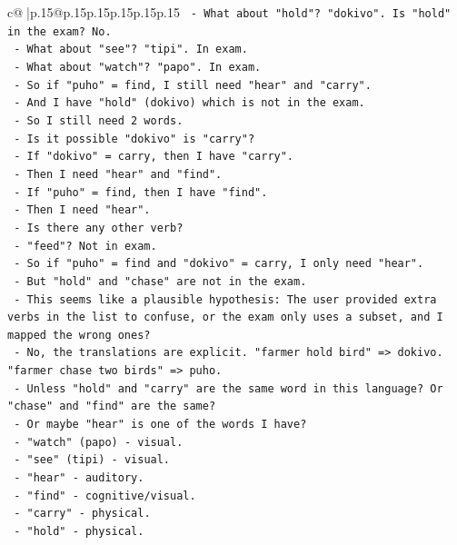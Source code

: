 \documentclass{article}
\begin{document}
{\begin{supertabular}{c@{$\;$}|p{.15\linewidth}@{}p{.15\linewidth}p{.15\linewidth}p{.15\linewidth}p{.15\linewidth}p{.15\linewidth}}
{{{\texttt{     {-} What about "hold"? "dokivo". Is "hold" in the exam? No.} \\
\texttt{     {-} What about "see"? "tipi". In exam.} \\
\texttt{     {-} What about "watch"? "papo". In exam.} \\
\texttt{     {-} So if "puho" = find, I still need "hear" and "carry".} \\
\texttt{     {-} And I have "hold" (dokivo) which is not in the exam.} \\
\texttt{     {-} So I still need 2 words.} \\
\texttt{     {-} Is it possible "dokivo" is "carry"?} \\
\texttt{     {-} If "dokivo" = carry, then I have "carry".} \\
\texttt{     {-} Then I need "hear" and "find".} \\
\texttt{     {-} If "puho" = find, then I have "find".} \\
\texttt{     {-} Then I need "hear".} \\
\texttt{     {-} Is there any other verb?} \\
\texttt{     {-} "feed"? Not in exam.} \\
\texttt{     {-} So if "puho" = find and "dokivo" = carry, I only need "hear".} \\
\texttt{     {-} But "hold" and "chase" are not in the exam.} \\
\texttt{     {-} This seems like a plausible hypothesis: The user provided extra verbs in the list to confuse, or the exam only uses a subset, and I mapped the wrong ones?} \\
\texttt{     {-} No, the translations are explicit. "farmer hold bird" => dokivo. "farmer chase two birds" => puho.} \\
\texttt{     {-} Unless "hold" and "carry" are the same word in this language? Or "chase" and "find" are the same?} \\
\texttt{     {-} Or maybe "hear" is one of the words I have?} \\
\texttt{     {-} "watch" (papo) {-} visual.} \\
\texttt{     {-} "see" (tipi) {-} visual.} \\
\texttt{     {-} "hear" {-} auditory.} \\
\texttt{     {-} "find" {-} cognitive/visual.} \\
\texttt{     {-} "carry" {-} physical.} \\
\texttt{     {-} "hold" {-} physical.} \\
}}}
\end{supertabular}}
\end{document}

